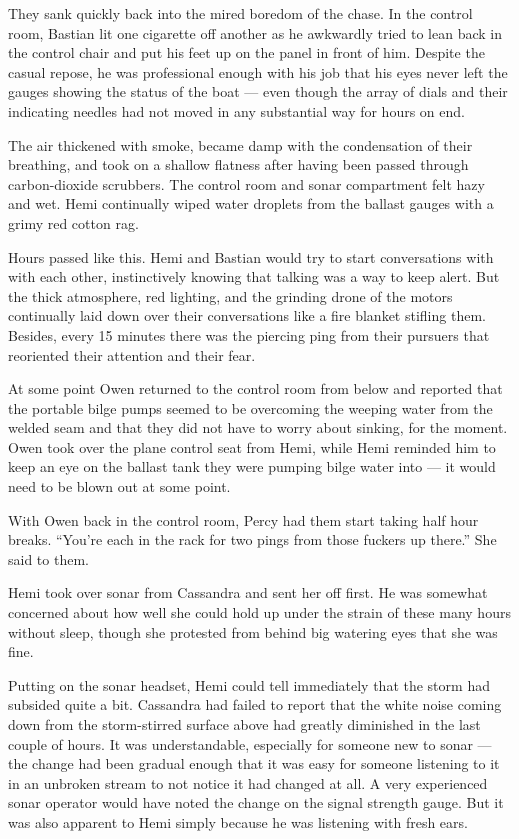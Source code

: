 \documentclass[]{scrbook}
\begin{document}
They sank quickly back into the mired boredom of the chase. In the
control room, Bastian lit one cigarette off another as he awkwardly
tried to lean back in the control chair and put his feet up on the panel
in front of him. Despite the casual repose, he was professional enough
with his job that his eyes never left the gauges showing the status of
the boat --- even though the array of dials and their indicating needles
had not moved in any substantial way for hours on end.

The air thickened with smoke, became damp with the condensation of their
breathing, and took on a shallow flatness after having been passed
through carbon-dioxide scrubbers. The control room and sonar compartment
felt hazy and wet. Hemi continually wiped water droplets from the
ballast gauges with a grimy red cotton rag.

Hours passed like this. Hemi and Bastian would try to start
conversations with with each other, instinctively knowing that talking
was a way to keep alert. But the thick atmosphere, red lighting, and the
grinding drone of the motors continually laid down over their
conversations like a fire blanket stifling them. Besides, every 15
minutes there was the piercing ping from their pursuers that reoriented
their attention and their fear.

At some point Owen returned to the control room from below and reported
that the portable bilge pumps seemed to be overcoming the weeping water
from the welded seam and that they did not have to worry about sinking,
for the moment. Owen took over the plane control seat from Hemi, while
Hemi reminded him to keep an eye on the ballast tank they were pumping
bilge water into --- it would need to be blown out at some point.

With Owen back in the control room, Percy had them start taking half
hour breaks. ``You're each in the rack for two pings from those fuckers
up there.'' She said to them.

Hemi took over sonar from Cassandra and sent her off first. He was
somewhat concerned about how well she could hold up under the strain of
these many hours without sleep, though she protested from behind big
watering eyes that she was fine.

Putting on the sonar headset, Hemi could tell immediately that the storm
had subsided quite a bit. Cassandra had failed to report that the white
noise coming down from the storm-stirred surface above had greatly
diminished in the last couple of hours. It was understandable,
especially for someone new to sonar --- the change had been gradual
enough that it was easy for someone listening to it in an unbroken
stream to not notice it had changed at all. A very experienced sonar
operator would have noted the change on the signal strength gauge. But
it was also apparent to Hemi simply because he was listening with fresh
ears.
\end{document}
